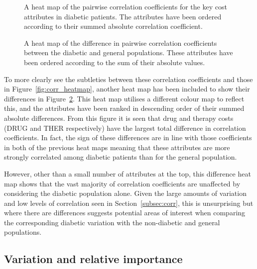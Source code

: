 \begin{figure}[htbp]
    \caption{A heat map of the pairwise correlation coefficients for the key
        cost attributes in diabetic patients. The attributes have been ordered
        according to their summed absolute correlation coefficient.}%
    \label{fig:diab_corr_heatmap}
\end{figure}

\begin{figure}[htbp]
    \caption{A heat map of the difference in pairwise correlation coefficients
        between the diabetic and general populations. These attributes have been
        ordered according to the sum of their absolute values.}%
    \label{fig:diab_corr_difference}
\end{figure}

To more clearly see the subtleties between these correlation coefficients and
those in Figure~\ref{fig:corr_heatmap}, another heat map has been included to
show their differences in Figure~\ref{fig:diab_corr_difference}. This heat
map utilises a different colour map to reflect this, and the attributes have
been ranked in descending order of their summed absolute differences. From this
figure it is seen that drug and therapy costs (DRUG and THER respectively) have
the largest total difference in correlation coefficients. In fact, the sign of
these differences are in line with those coefficients in both of the previous
heat maps meaning that these attributes are more strongly correlated among
diabetic patients than for the general population.

However, other than a small number of attributes at the top, this difference
heat map shows that the vast majority of correlation coefficients are unaffected
by considering the diabetic population alone. Given the large amounts of
variation and low levels of correlation seen in Section~\ref{subsec:corr}, this
is unsurprising but where there are differences suggests potential areas of
interest when comparing the corresponding diabetic variation with the
non-diabetic and general populations.


\subsection{Variation and relative importance}\label{subsec:diab_variation}


